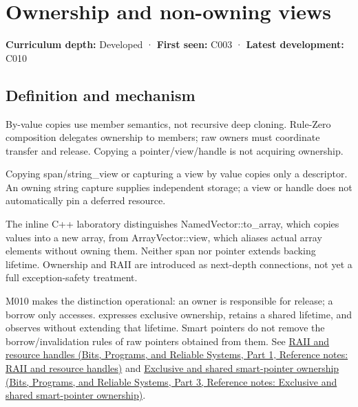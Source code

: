 \hypertarget{appendix-d52e4486f527}{}\label{referencestart:appendix-d52e4486f527}
\section{Ownership and non-owning views}\label{appendix-d52e4486f527-ownership-and-non-owning-views}

\hypertarget{appendix-d52e4486f527-ownership-and-non-owning-views}{}

\textbf{Curriculum depth:} Developed · \textbf{First seen:} C003 · \textbf{Latest development:} C010

\begin{allmightroledefinition}

\subsection{Definition and mechanism}\label{appendix-d52e4486f527-definition-and-mechanism}

\hypertarget{appendix-d52e4486f527-definition-and-mechanism}{}

By-value copies use member semantics, not recursive deep cloning. Rule-Zero composition delegates ownership to members; raw owners must coordinate transfer and release. Copying a pointer/view/handle is not acquiring ownership.

\end{allmightroledefinition}

Copying span/string\_view or capturing a view by value copies only a descriptor. An owning string capture supplies independent storage; a view or handle does not automatically pin a deferred resource.

The inline C++ laboratory distinguishes NamedVector::to\_array, which copies values into a new array, from ArrayVector::view, which aliases actual array elements without owning them. Neither span nor pointer extends backing lifetime. Ownership and RAII are introduced as next-depth connections, not yet a full exception-safety treatment.

M010 makes the distinction operational: an owner is responsible for release; a borrow only accesses.  expresses exclusive ownership,  retains a shared lifetime, and  observes without extending that lifetime. Smart pointers do not remove the borrow/invalidation rules of raw pointers obtained from them. See \href{../01-Bits-Programs-and-Reliable-Systems-P01/main.pdf\#appendix-69739d3ab49b}{RAII and resource handles (Bits, Programs, and Reliable Systems, Part 1, Reference notes: RAII and resource handles)} and \href{../01-Bits-Programs-and-Reliable-Systems-P03/main.pdf\#appendix-51602cabe815}{Exclusive and shared smart-pointer ownership (Bits, Programs, and Reliable Systems, Part 3, Reference notes: Exclusive and shared smart-pointer ownership)}.

